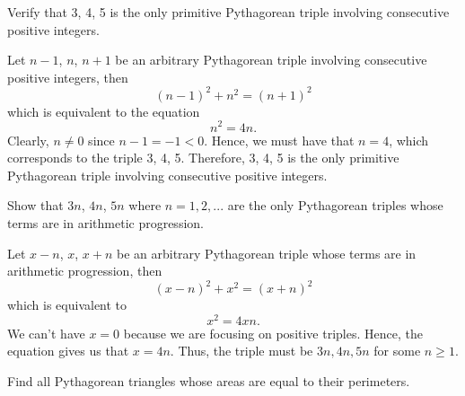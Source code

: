 \begin{exercise}
    Verify that 3, 4, 5 is the only primitive Pythagorean triple involving consecutive positive integers.\\
\end{exercise}

\begin{solution}
    Let $n-1$, $n$, $n+1$ be an arbitrary Pythagorean triple involving consecutive positive integers, then
    $$(n-1)^2 + n^2 = (n+1)^2$$
    which is equivalent to the equation 
    $$n^2 = 4n.$$
    Clearly, $n \neq 0$ since $n-1 = -1 < 0$. Hence, we must have that $n = 4$, which corresponds to the triple 3, 4, 5. Therefore, 3, 4, 5 is the only primitive Pythagorean triple involving consecutive positive integers.\\
\end{solution}

\begin{exercise}
    Show that $3n$, $4n$, $5n$ where $n = 1,2, ...$ are the only Pythagorean triples whose terms are in arithmetic progression.  \\
\end{exercise}

\begin{solution}
    Let $x - n$, $x$, $x + n$ be an arbitrary Pythagorean triple whose terms are in arithmetic progression, then
    $$(x-n)^2 + x^2 = (x+ n)^2$$
    which is equivalent to 
    $$x^2 = 4xn.$$
    We can't have $x=0$ because we are focusing on positive triples. Hence, the equation gives us that $x = 4n$. Thus, the triple must be $3n, 4n, 5n$ for some $n \geq 1$. \\
\end{solution}

\begin{exercise}
    Find all Pythagorean triangles whose areas are equal to their perimeters.  \\
\end{exercise}

